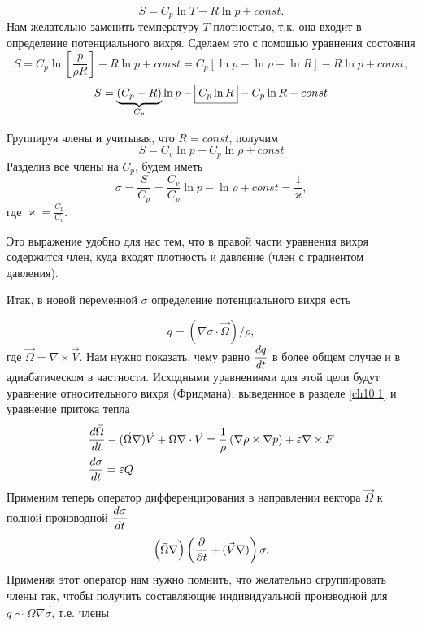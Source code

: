 \begin{equation*}
    S = C_p \ln{T} - R \ln{p} + const.
\end{equation*}
Нам желательно заменить температуру $T$ плотностью, т.к. она входит в определение потенциального вихря. Сделаем это с помощью уравнения состояния 
    \[ S=C_p \ln{ \left[\frac{p}{\rho R} \right] } - R \ln{p} + const = C_p \left[ \ln{p} - \ln{\rho} - \ln{R} \right] - R \ln{p} + const, \]
    \[ S = \underbrace{(C_p - R)}_{C_p} \ln{p} - \boxed{C_p \tikzmark{z3} \ln{R} } - C_p \ln{R} + co\tikzmark{z4}nst
    \]
Группируя члены и учитывая, что $R=const$, получим
\[
S = C_v \ln{p} - C_p \ln{\rho} + const
\]
Разделив все члены на $C_p$, будем иметь
\begin{equation*}
    \sigma = \frac{S}{C_p} = \frac{C_v}{C_p} \ln{p} - \ln{\rho} + const = \frac{1}{\varkappa} ,
\end{equation*}
где $\varkappa=\frac{C_p}{C_v}$.

Это выражение удобно для нас тем, что в правой части уравнения вихря содержится член, куда входят плотность и давление (член с градиентом давления).

Итак, в новой переменной $\sigma$ определение потенциального вихря есть 

\[
q = ( \nabla \sigma \cdot \Vec{\Omega} ) / \rho, 
\]
где $\vec{\Omega}=\nabla \times \vec{V}$. Нам нужно показать, чему равно $\displaystyle\frac{d q}{d t}$ в более общем случае и в адиабатическом в частности. Исходными уравнениями для этой цели будут уравнение относительного вихря (Фридмана), выведенное в разделе \ref{ch10.1} и уравнение притока тепла
\begin{align}
    &\displaystyle\frac{d  \vec{ \Omega} }{d t} - (\vec{\Omega}\nabla)\vec{V} + \Omega \nabla\cdot\vec{V} = \frac{1}{\rho} \left( \nabla \rho \times \nabla p \right) + \varepsilon \nabla \times F \label{eq:ch10_relvort} \\
    &\displaystyle\frac{d \sigma}{d t} = \varepsilon Q \label{eq:ch10_DsigmaDt}
\end{align}
Применим теперь оператор дифференцирования в направлении вектора $\vec{\Omega}$ к полной производной $\displaystyle\frac{d \sigma}{d t}$
\begin{equation}
\label{eq:ch10-theta1}
    \displaystyle \left(  \vec{\Omega}\nabla  \right) 
    \displaystyle \left(  \displaystyle\frac{\partial }{\partial t}+(\vec{V}\nabla)  \right) \sigma.
\end{equation}
Применяя этот оператор нам нужно помнить, что желательно сгруппировать члены так, чтобы получить составляющие индивидуальной производной для $q\sim\vec{\Omega\nabla\sigma}$, т.е. члены

